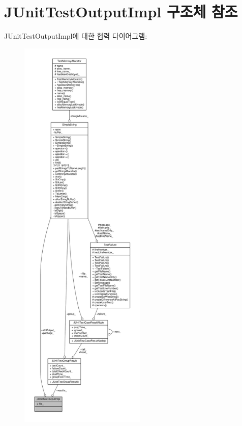\hypertarget{struct_j_unit_test_output_impl}{}\section{J\+Unit\+Test\+Output\+Impl 구조체 참조}
\label{struct_j_unit_test_output_impl}


J\+Unit\+Test\+Output\+Impl에 대한 협력 다이어그램\+:
\nopagebreak
\begin{figure}[H]
\begin{center}
\leavevmode
\includegraphics[height=550pt]{struct_j_unit_test_output_impl__coll__graph}
\end{center}
\end{figure}
